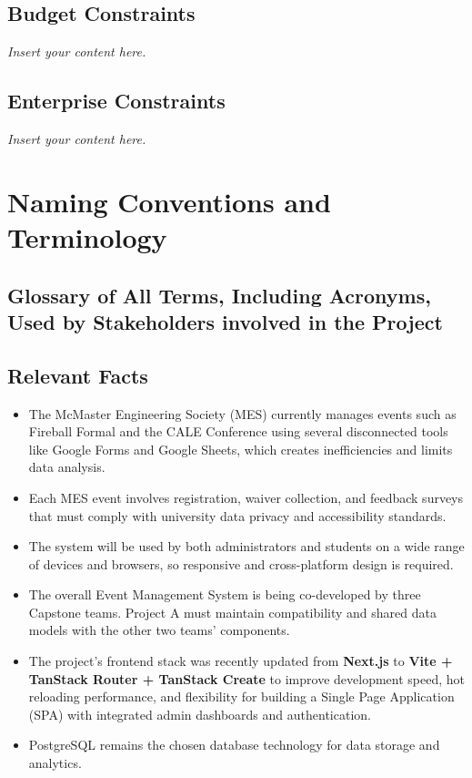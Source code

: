 \documentclass[12pt]{article}
\newcommand{\lips}{\textit{Insert your content here.}}
\begin{document}
\subsection{Budget Constraints}
\lips
\subsection{Enterprise Constraints}
\lips

\section{Naming Conventions and Terminology}
\subsection{Glossary of All Terms, Including Acronyms, Used by Stakeholders
involved in the Project}
\glsaddall
\printnoidxglossaries

\subsection{Relevant Facts}

\begin{itemize}
    \item The McMaster Engineering Society (MES) currently manages events such as Fireball Formal and the CALE Conference using several disconnected tools like Google Forms and Google Sheets, which creates inefficiencies and limits data analysis.
    \item Each MES event involves registration, waiver collection, and feedback surveys that must comply with university data privacy and accessibility standards.
    \item The system will be used by both administrators and students on a wide range of devices and browsers, so responsive and cross-platform design is required.
    \item The overall Event Management System is being co-developed by three Capstone teams. Project A must maintain compatibility and shared data models with the other two teams’ components.
    \item The project’s frontend stack was recently updated from \textbf{Next.js} to \textbf{Vite + TanStack Router + TanStack Create} to improve development speed, hot reloading performance, and flexibility for building a Single Page Application (SPA) with integrated admin dashboards and authentication.
    \item PostgreSQL remains the chosen database technology for data storage and analytics.
\end{itemize}
\end{document}
